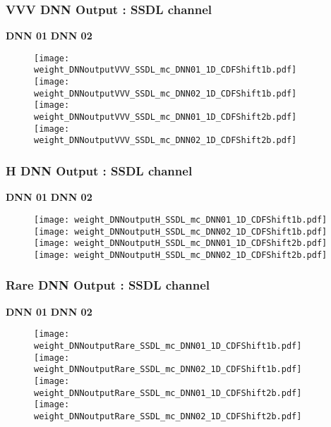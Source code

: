 \documentclass[9pt]{beamer}
\begin{document}
\begin{frame}
	\frametitle{VVV DNN Output : SSDL channel}
	\hspace{2.0cm} \textbf{DNN 01} \hspace{4cm} \textbf{DNN 02} 
	\begin{figure}
		\texttt{[image: weight\_DNNoutputVVV\_SSDL\_mc\_DNN01\_1D\_CDFShift1b.pdf]}
		\texttt{[image: weight\_DNNoutputVVV\_SSDL\_mc\_DNN02\_1D\_CDFShift1b.pdf]}\\
		\texttt{[image: weight\_DNNoutputVVV\_SSDL\_mc\_DNN01\_1D\_CDFShift2b.pdf]}
		\texttt{[image: weight\_DNNoutputVVV\_SSDL\_mc\_DNN02\_1D\_CDFShift2b.pdf]}
	\end{figure}
\end{frame}
\begin{frame}
	\frametitle{H DNN Output : SSDL channel}
	\hspace{2.0cm} \textbf{DNN 01} \hspace{4cm} \textbf{DNN 02} 
	\begin{figure}
		\texttt{[image: weight\_DNNoutputH\_SSDL\_mc\_DNN01\_1D\_CDFShift1b.pdf]}
		\texttt{[image: weight\_DNNoutputH\_SSDL\_mc\_DNN02\_1D\_CDFShift1b.pdf]}\\
		\texttt{[image: weight\_DNNoutputH\_SSDL\_mc\_DNN01\_1D\_CDFShift2b.pdf]}
		\texttt{[image: weight\_DNNoutputH\_SSDL\_mc\_DNN02\_1D\_CDFShift2b.pdf]}
	\end{figure}
\end{frame}
\begin{frame}
	\frametitle{Rare DNN Output : SSDL channel}
	\hspace{2.0cm} \textbf{DNN 01} \hspace{4cm} \textbf{DNN 02} 
	\begin{figure}
		\texttt{[image: weight\_DNNoutputRare\_SSDL\_mc\_DNN01\_1D\_CDFShift1b.pdf]}
		\texttt{[image: weight\_DNNoutputRare\_SSDL\_mc\_DNN02\_1D\_CDFShift1b.pdf]}\\
		\texttt{[image: weight\_DNNoutputRare\_SSDL\_mc\_DNN01\_1D\_CDFShift2b.pdf]}
		\texttt{[image: weight\_DNNoutputRare\_SSDL\_mc\_DNN02\_1D\_CDFShift2b.pdf]}
	\end{figure}
\end{frame}
\end{document}
